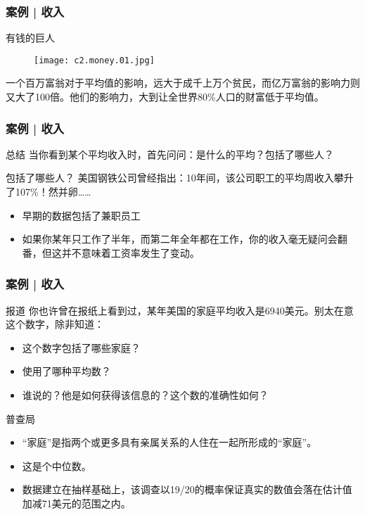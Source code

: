 \begin{frame}
  \frametitle{案例 | 收入}
  \begin{block}{有钱的巨人}
  \begin{figure}
    \centering
    \texttt{[image: c2.money.01.jpg]}
  \end{figure}
  一个百万富翁对于平均值的影响，远大于成千上万个贫民，而亿万富翁的影响力则又大了100倍。他们的影响力，大到让全世界80\%人口的财富低于平均值。
  \end{block}
\end{frame}

\begin{frame}
  \frametitle{案例 | 收入}
  \begin{block}{总结}
    当你看到某个平均收入时，首先问问：是什么的平均？包括了哪些人？
  \end{block}
  \pause
  \begin{block}{包括了哪些人？}
    美国钢铁公司曾经指出：10年间，该公司职工的平均周收入攀升了107\%！然并卵……
    \pause
    \begin{itemize}
      \item 早期的数据包括了兼职员工
      \item 如果你某年只工作了半年，而第二年全年都在工作，你的收入毫无疑问会翻番，但这并不意味着工资率发生了变动。
    \end{itemize}
  \end{block}
\end{frame}

\begin{frame}
  \frametitle{案例 | 收入}
  \begin{block}{报道}
    你也许曾在报纸上看到过，某年美国的家庭平均收入是6940美元。别太在意这个数字，除非知道：
    \begin{itemize}
      \item 这个数字包括了哪些家庭？
      \item 使用了哪种平均数？
      \item 谁说的？他是如何获得该信息的？这个数的准确性如何？
    \end{itemize}
  \end{block}
  \pause
  \begin{block}{普查局}
    \begin{itemize}
      \item “家庭”是指两个或更多具有亲属关系的人住在一起所形成的“家庭”。
      \item 这是个中位数。
      \item 数据建立在抽样基础上，该调查以19/20的概率保证真实的数值会落在估计值加减71美元的范围之内。
    \end{itemize}
  \end{block}
\end{frame}

